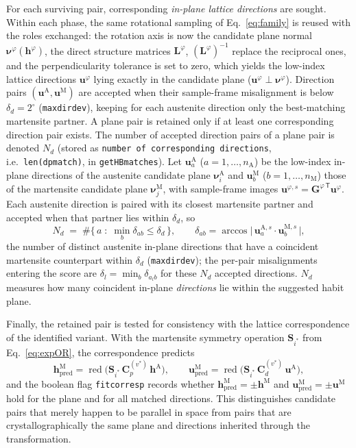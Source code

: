 \documentclass[11pt,a4paper]{article}
\newcommand{\mat}[1]{\mathbf{#1}}
\newcommand{\vc}[1]{\bm{#1}}
\begin{document}
For each surviving pair, corresponding \emph{in-plane lattice directions} are sought. Within each phase, the same rotational sampling of Eq.~\eqref{eq:family} is reused with the roles exchanged: the rotation axis is now the candidate plane normal $\vc\nu^{\varphi}(\vc h^{\varphi})$, the direct structure matrices $\mat L^{\varphi}$, $(\mat L^{\varphi})^{-1}$ replace the reciprocal ones, and the perpendicularity tolerance is set to zero, which yields the low-index lattice directions $\vc u^{\varphi}$ lying exactly in the candidate plane ($\vc u^{\varphi}\perp\vc\nu^{\varphi}$). Direction pairs $(\vc u^{\mathrm A},\vc u^{\mathrm M})$ are accepted when their sample-frame misalignment is below $\delta_d=2^\circ$ (\texttt{maxdirdev}), keeping for each austenite direction only the best-matching martensite partner. A plane pair is retained only if at least one corresponding direction pair exists. The number of accepted direction pairs of a plane pair is denoted $N_d$ (stored as \texttt{number of corresponding directions}, i.e.\ \texttt{len(dpmatch)}, in \texttt{getHBmatches}). Let $\vc u^{\mathrm A}_a$ ($a=1,\dots,n_{\mathrm A}$) be the low-index in-plane directions of the austenite candidate plane $\vc\nu^{\mathrm A}_i$ and $\vc u^{\mathrm M}_b$ ($b=1,\dots,n_{\mathrm M}$) those of the martensite candidate plane $\vc\nu^{\mathrm M}_j$, with sample-frame images $\vc u^{\varphi,s}=\mat G^{\varphi\,\mathsf T}\vc u^{\varphi}$. Each austenite direction is paired with its closest martensite partner and accepted when that partner lies within $\delta_d$, so
\begin{equation}
N_d \;=\; \#\Big\{\, a \;:\; \min_b \delta_{ab} \le \delta_d \,\Big\},
\qquad
\delta_{ab}=\arccos\big|\,\vc u^{\mathrm A,s}_a\cdot\vc u^{\mathrm M,s}_b\,\big|,
\label{eq:ndirs}
\end{equation}
the number of distinct austenite in-plane directions that have a coincident martensite counterpart within $\delta_d$ (\texttt{maxdirdev}); the per-pair misalignments entering the score are $\delta_l=\min_b\delta_{a_l b}$ for these $N_d$ accepted directions. $N_d$ measures how many coincident in-plane \emph{directions} lie within the suggested habit plane.

Finally, the retained pair is tested for consistency with the lattice correspondence of the identified variant. With the martensite symmetry operation $\mat S_{i^\ast}$ from Eq.~\eqref{eq:expOR}, the correspondence predicts
\begin{equation}
\vc h^{\mathrm M}_{\mathrm{pred}}=\operatorname{red}\big(\mat S_{i^\ast}\,\mat C_p^{(v^\ast)}\,\vc h^{\mathrm A}\big),
\qquad
\vc u^{\mathrm M}_{\mathrm{pred}}=\operatorname{red}\big(\mat S_{i^\ast}\,\mat C_d^{(v^\ast)}\,\vc u^{\mathrm A}\big),
\label{eq:corresp}
\end{equation}
and the boolean flag \texttt{fitcorresp} records whether $\vc h^{\mathrm M}_{\mathrm{pred}}=\pm\vc h^{\mathrm M}$ and $\vc u^{\mathrm M}_{\mathrm{pred}}=\pm\vc u^{\mathrm M}$ hold for the plane and for all matched directions. This distinguishes candidate pairs that merely happen to be parallel in space from pairs that are crystallographically the same plane and directions inherited through the transformation.
\end{document}
